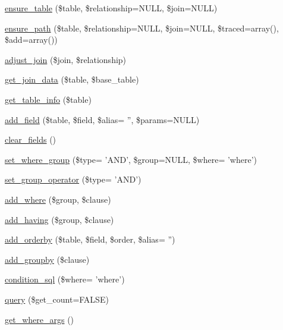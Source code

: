 \begin{CompactItemize}
\item 
\hyperlink{classviews__query_78c615fc19826e8a640ab27874e2fdaf}{ensure\_\-table} (\$table, \$relationship=NULL, \$join=NULL)
\item 
\hyperlink{classviews__query_2571123727140d93d8ee3357968a626e}{ensure\_\-path} (\$table, \$relationship=NULL, \$join=NULL, \$traced=array(), \$add=array())
\item 
\hyperlink{classviews__query_9eb7d6626aa24ae83d922cc59682318c}{adjust\_\-join} (\$join, \$relationship)
\item 
\hyperlink{classviews__query_de77e3ef670bde3a2eacf8d73f5859fa}{get\_\-join\_\-data} (\$table, \$base\_\-table)
\item 
\hyperlink{classviews__query_e4b476ae432575dab501ed30b5421b7d}{get\_\-table\_\-info} (\$table)
\item 
\hyperlink{classviews__query_7d073b7dde56cfb8c0e97696b50d5da4}{add\_\-field} (\$table, \$field, \$alias= '', \$params=NULL)
\item 
\hyperlink{classviews__query_f36b1f088b20f1d98d23dbf49ee68e97}{clear\_\-fields} ()
\item 
\hyperlink{classviews__query_7c803401b485f379a93688efd7aa2886}{set\_\-where\_\-group} (\$type= 'AND', \$group=NULL, \$where= 'where')
\item 
\hyperlink{classviews__query_8dfc6f355b29f697401f0dc7f7aa82a1}{set\_\-group\_\-operator} (\$type= 'AND')
\item 
\hyperlink{classviews__query_88733d15379fa820cc588b11a298a3af}{add\_\-where} (\$group, \$clause)
\item 
\hyperlink{classviews__query_db01fc3898236d7f3c9134cd5971ff67}{add\_\-having} (\$group, \$clause)
\item 
\hyperlink{classviews__query_d6ad02de9d393f27da6b998ff54a91ec}{add\_\-orderby} (\$table, \$field, \$order, \$alias= '')
\item 
\hyperlink{classviews__query_089b7eab81ec9cb4b24aa489ff4ac448}{add\_\-groupby} (\$clause)
\item 
\hyperlink{classviews__query_2048d9a8aefd815a30833b26f6070fb2}{condition\_\-sql} (\$where= 'where')
\item 
\hyperlink{classviews__query_50460c7856f25847d361a45a6c1d4b69}{query} (\$get\_\-count=FALSE)
\item 
\hyperlink{classviews__query_caf5f2625a89d8b29e6d9ad6127d1b17}{get\_\-where\_\-args} ()
\end{CompactItemize}
